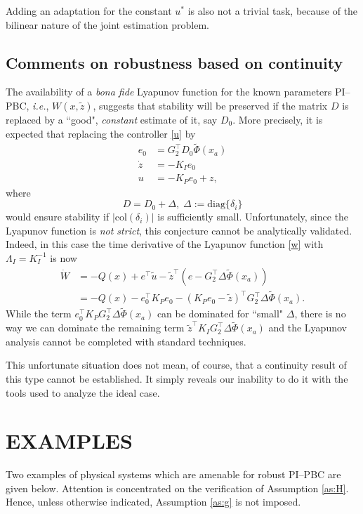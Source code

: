 \documentclass[10pt, conference]{ieeeconf}
\newcommand{\Gstas}{G_2}
\newcommand{\col}{ \mbox{col} }
\def\diag{\mbox{diag}}
\def\lab{\label}
\begin{document}
Adding an adaptation for the constant $u^*$ is also not a trivial task, because of the bilinear nature of the joint estimation problem.
\subsection{Comments on robustness based on continuity}
\lab{subsec53}	
The availability of a {\em bona fide} Lyapunov function for the known parameters PI--PBC, {\em i.e.}, $W(x,\tilde z)$, suggests that stability will be preserved if the matrix $D$ is replaced by a ``good", {\em constant} estimate of it, say $D_0$. More precisely, it is expected that replacing the controller \eqref{u} by
$$
\begin{aligned}
                 e_0 &=\Gstas^\top D_0 \widetilde {\Phi}(x_a)\\
            \dot{z} &= - K_I  e_0\\
	      		u &= - K_P e_0 + z,
	\end{aligned}
$$
where
$$
D=D_0 + \Delta,\;\Delta:=\diag\{\delta_i\}
$$
would ensure stability if $|\col(\delta_i)|$ is sufficiently small. Unfortunately, since the Lyapunov function is {\em not strict}, this conjecture cannot be analytically validated. Indeed, in this case the time derivative of the Lyapunov function \eqref{w} with $ \Lambda_I= K_I^{-1}$ is now
$$
	\begin{aligned}
		\dot{W} &= -Q(x) + e^\top \tilde u - \tilde{z}^\top (e-\Gstas^\top \Delta \widetilde {\Phi}(x_a))\\
		 &= -Q(x) - e_0^\top K_P e_0 - (K_P e_0 - \tilde z)^\top \Gstas^\top  \Delta \widetilde \Phi(x_a).
	\end{aligned}
$$
While the term $e_0^\top K_P \Gstas^\top  \Delta \widetilde \Phi(x_a)$ can be dominated for ``small" $\Delta$, there is no way we can dominate the remaining term $ \tilde z^\top K_I \Gstas^\top  \Delta \widetilde \Phi(x_a)$ and the Lyapunov analysis cannot be completed with standard techniques.

This unfortunate situation does not mean, of course, that a continuity result of this type cannot be established. It simply reveals our inability to do it with the tools used to analyze the ideal case.
\section{EXAMPLES}
\lab{sec6}	
Two examples of physical systems  which are amenable for robust PI--PBC are given below. Attention is concentrated on the verification of Assumption \ref{as:H}. Hence, unless otherwise indicated, Assumption \ref{as:g} is not imposed.
\end{document}
